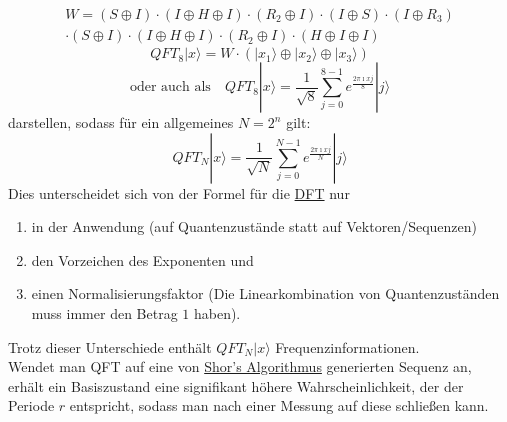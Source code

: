 \begin{multline}
	W = (S\oplus I)\cdot (I \oplus H \oplus I) \cdot (R_2 \oplus I) \cdot (I \oplus S) \cdot (I\oplus R_3)\\ \cdot (S \oplus I) \cdot (I \oplus H \oplus I) \cdot (R_2 \oplus I) \cdot (H \oplus I \oplus I)
\end{multline}
\[QFT_8 |x\rangle = W \cdot \left(|x_1\rangle \oplus |x_2\rangle \oplus |x_3\rangle\right)\]
\[\text{oder auch als}\quad QFT_8 |x\rangle = \frac{1}{\sqrt{8}}\sum_{j=0}^{8-1} e^{\frac{2\pi \imath x j}{8}}|j\rangle\]
darstellen, sodass für ein allgemeines \(N = 2^n\) gilt:
\[QFT_N |x\rangle = \frac{1}{\sqrt{N}}\sum_{j=0}^{N-1} e^{\frac{2\pi \imath x j}{N}}|j\rangle\]
Dies unterscheidet sich von der Formel für die \hyperref[sec:DFT]{DFT} nur
\begin{enumerate}
	\item in der Anwendung (auf Quantenzustände statt auf Vektoren/Sequenzen)
	\item den Vorzeichen des Exponenten und
	\item einen Normalisierungsfaktor (Die Linearkombination von Quantenzuständen muss immer den Betrag \(1\) haben).
\end{enumerate}
Trotz dieser Unterschiede enthält \(QFT_N |x\rangle\) Frequenzinformationen.\\
Wendet man QFT auf eine von \hyperref[sec:shor]{Shor's Algorithmus} generierten Sequenz an, erhält ein Basiszustand eine signifikant höhere Wahrscheinlichkeit, der der Periode \(r\) entspricht, sodass man nach einer Messung auf diese schließen kann.